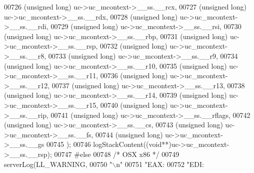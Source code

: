 \begin{DoxyCode}
{{{{{{{{{{{{{{{{{{{{{{{{{{{{{{{{{{{{{{{{{{{{{{{{{00726         (\textcolor{keywordtype}{unsigned} \textcolor{keywordtype}{long}) uc->uc\_mcontext->\_\_ss.\_\_rcx,
00727         (\textcolor{keywordtype}{unsigned} \textcolor{keywordtype}{long}) uc->uc\_mcontext->\_\_ss.\_\_rdx,
00728         (\textcolor{keywordtype}{unsigned} \textcolor{keywordtype}{long}) uc->uc\_mcontext->\_\_ss.\_\_rdi,
00729         (\textcolor{keywordtype}{unsigned} \textcolor{keywordtype}{long}) uc->uc\_mcontext->\_\_ss.\_\_rsi,
00730         (\textcolor{keywordtype}{unsigned} \textcolor{keywordtype}{long}) uc->uc\_mcontext->\_\_ss.\_\_rbp,
00731         (\textcolor{keywordtype}{unsigned} \textcolor{keywordtype}{long}) uc->uc\_mcontext->\_\_ss.\_\_rsp,
00732         (\textcolor{keywordtype}{unsigned} \textcolor{keywordtype}{long}) uc->uc\_mcontext->\_\_ss.\_\_r8,
00733         (\textcolor{keywordtype}{unsigned} \textcolor{keywordtype}{long}) uc->uc\_mcontext->\_\_ss.\_\_r9,
00734         (\textcolor{keywordtype}{unsigned} \textcolor{keywordtype}{long}) uc->uc\_mcontext->\_\_ss.\_\_r10,
00735         (\textcolor{keywordtype}{unsigned} \textcolor{keywordtype}{long}) uc->uc\_mcontext->\_\_ss.\_\_r11,
00736         (\textcolor{keywordtype}{unsigned} \textcolor{keywordtype}{long}) uc->uc\_mcontext->\_\_ss.\_\_r12,
00737         (\textcolor{keywordtype}{unsigned} \textcolor{keywordtype}{long}) uc->uc\_mcontext->\_\_ss.\_\_r13,
00738         (\textcolor{keywordtype}{unsigned} \textcolor{keywordtype}{long}) uc->uc\_mcontext->\_\_ss.\_\_r14,
00739         (\textcolor{keywordtype}{unsigned} \textcolor{keywordtype}{long}) uc->uc\_mcontext->\_\_ss.\_\_r15,
00740         (\textcolor{keywordtype}{unsigned} \textcolor{keywordtype}{long}) uc->uc\_mcontext->\_\_ss.\_\_rip,
00741         (\textcolor{keywordtype}{unsigned} \textcolor{keywordtype}{long}) uc->uc\_mcontext->\_\_ss.\_\_rflags,
00742         (\textcolor{keywordtype}{unsigned} \textcolor{keywordtype}{long}) uc->uc\_mcontext->\_\_ss.\_\_cs,
00743         (\textcolor{keywordtype}{unsigned} \textcolor{keywordtype}{long}) uc->uc\_mcontext->\_\_ss.\_\_fs,
00744         (\textcolor{keywordtype}{unsigned} \textcolor{keywordtype}{long}) uc->uc\_mcontext->\_\_ss.\_\_gs
00745     );
00746     logStackContent((\textcolor{keywordtype}{void}**)uc->uc\_mcontext->\_\_ss.\_\_rsp);
00747     \textcolor{preprocessor}{#}\textcolor{preprocessor}{else}
00748     \textcolor{comment}{/* OSX x86 */}
00749     serverLog(LL\_WARNING,
00750     \textcolor{stringliteral}{"\(\backslash\)n"}
00751     \textcolor{stringliteral}{"EAX:%
00752     \textcolor{stringliteral}{"EDI:%
}}}}}}}}}}}}}}}}}}}}}}}}}}}}}}}}}}}}}}}}}}}}}}}}}}}
\end{DoxyCode}
